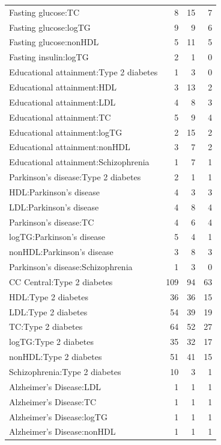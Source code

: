 \begin{table}[ht]
\begin{tabular}{lrrr}
  Fasting glucose:TC &   8 &  15 &   7 \\ 
  Fasting glucose:logTG &   9 &   9 &   6 \\ 
  Fasting glucose:nonHDL &   5 &  11 &   5 \\ 
  Fasting insulin:logTG &   2 &   1 &   0 \\ 
  Educational attainment:Type 2 diabetes &   1 &   3 &   0 \\ 
  Educational attainment:HDL &   3 &  13 &   2 \\ 
  Educational attainment:LDL &   4 &   8 &   3 \\ 
  Educational attainment:TC &   5 &   9 &   4 \\ 
  Educational attainment:logTG &   2 &  15 &   2 \\ 
  Educational attainment:nonHDL &   3 &   7 &   2 \\ 
  Educational attainment:Schizophrenia &   1 &   7 &   1 \\ 
  Parkinson's disease:Type 2 diabetes &   2 &   1 &   1 \\ 
  HDL:Parkinson's disease &   4 &   3 &   3 \\ 
  LDL:Parkinson's disease &   4 &   8 &   4 \\ 
  Parkinson's disease:TC &   4 &   6 &   4 \\ 
  logTG:Parkinson's disease &   5 &   4 &   1 \\ 
  nonHDL:Parkinson's disease &   3 &   8 &   3 \\ 
  Parkinson's disease:Schizophrenia &   1 &   3 &   0 \\ 
  CC Central:Type 2 diabetes & 109 &  94 &  63 \\ 
  HDL:Type 2 diabetes &  36 &  36 &  15 \\ 
  LDL:Type 2 diabetes &  54 &  39 &  19 \\ 
  TC:Type 2 diabetes &  64 &  52 &  27 \\ 
  logTG:Type 2 diabetes &  35 &  32 &  17 \\ 
  nonHDL:Type 2 diabetes &  51 &  41 &  15 \\ 
  Schizophrenia:Type 2 diabetes &  10 &   3 &   1 \\ 
  Alzheimer's Disease:LDL &   1 &   1 &   1 \\ 
  Alzheimer's Disease:TC &   1 &   1 &   1 \\ 
  Alzheimer's Disease:logTG &   1 &   1 &   1 \\ 
  Alzheimer's Disease:nonHDL &   1 &   1 &   1 \\ 

\end{tabular}
\end{table}
